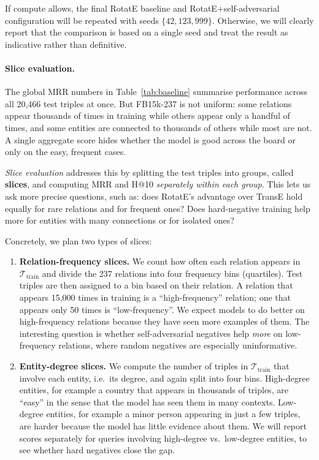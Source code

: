 \documentclass{llncs}
\begin{document}
If compute allows, the final RotatE baseline and RotatE+self-adversarial
configuration will be repeated with seeds $\{42,123,999\}$.
Otherwise, we will clearly report that the comparison is based on a single
seed and treat the result as indicative rather than definitive.

\paragraph{Slice evaluation.}
\label{sec:slices}

The global MRR numbers in Table~\ref{tab:baseline} summarise performance
across all 20,466 test triples at once.
But FB15k-237 is not uniform: some relations appear thousands of times in
training while others appear only a handful of times, and some entities
are connected to thousands of others while most are not.
A single aggregate score hides whether the model is good across the board
or only on the easy, frequent cases.

\emph{Slice evaluation} addresses this by splitting the test triples into
groups, called \textbf{slices}, and computing MRR and H@10
\emph{separately within each group}.
This lets us ask more precise questions, such as: does RotatE's advantage
over TransE hold equally for rare relations and for frequent ones?
Does hard-negative training help more for entities with many connections
or for isolated ones?

Concretely, we plan two types of slices:

\begin{enumerate}
  \item \textbf{Relation-frequency slices.}
    We count how often each relation appears in $\mathcal{T}_{\text{train}}$
    and divide the 237 relations into four frequency bins (quartiles).
    Test triples are then assigned to a bin based on their relation.
    A relation that appears 15,000 times in training is a ``high-frequency''
    relation; one that appears only 50 times is ``low-frequency''.
    We expect models to do better on high-frequency relations because they
    have seen more examples of them.
    The interesting question is whether self-adversarial negatives help
    \emph{more} on low-frequency relations, where random negatives are
    especially uninformative.

  \item \textbf{Entity-degree slices.}
    We compute the number of triples in $\mathcal{T}_{\text{train}}$ that
    involve each entity, i.e.\ its degree, and again split into four bins.
    High-degree entities, for example a country that appears in thousands
    of triples, are ``easy'' in the sense that the model has seen them in
    many contexts.
    Low-degree entities, for example a minor person appearing in just a few
    triples, are harder because the model has little evidence about them.
    We will report scores separately for queries involving high-degree vs.\
    low-degree entities, to see whether hard negatives close the gap.
\end{enumerate}
\end{document}
